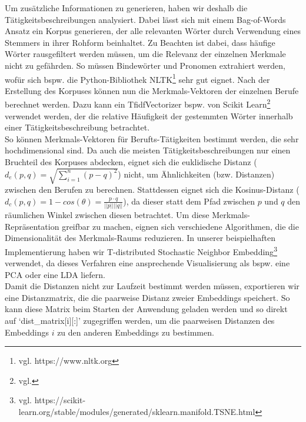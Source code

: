 \documentclass[10pt]{article}
\begin{document}
Um zusätzliche Informationen zu generieren, haben wir deshalb die Tätigkeitsbeschreibungen analysiert. Dabei lässt sich mit einem Bag-of-Words Ansatz ein Korpus generieren, der alle relevanten Wörter durch Verwendung eines Stemmers in ihrer Rohform beinhaltet. Zu Beachten ist dabei, dass häufige Wörter rausgefiltert werden müssen, um die Relevanz der einzelnen Merkmale nicht zu gefährden. So müssen Bindewörter und Pronomen extrahiert werden, wofür sich bspw. die Python-Bibliothek NLTK\footnote{vgl. https://www.nltk.org} sehr gut eignet. Nach der Erstellung des Korpuses können nun die Merkmals-Vektoren der einzelnen Berufe berechnet werden. Dazu kann ein TfidfVectorizer bspw. von Scikit Learn\footnote{vgl.} verwendet werden, der die relative Häufigkeit der gestemmten Wörter innerhalb einer Tätigkeitsbeschreibung betrachtet.\\

So können Merkmals-Vektoren für Berufts-Tätigkeiten bestimmt werden, die sehr hochdimensional sind. Da auch die meisten Tätigkeitsbeschreibungen nur einen Bruchteil des Korpuses abdecken, eignet sich die euklidische Distanz ($d_e(p,q) = \sqrt{\sum_{i=1}^n (p-q)^2}$) nicht, um Ähnlichkeiten (bzw. Distanzen) zwischen den Berufen zu berechnen. Stattdessen eignet sich die Kosinus-Distanz ($d_c(p,q) = 1 - cos(\theta) = \frac{p \cdot q}{||p|| ||q||}$), da dieser statt dem Pfad zwischen $p$ und $q$ den räumlichen Winkel zwischen diesen betrachtet. Um diese Merkmals-Repräsentation greifbar zu machen, eignen sich verschiedene Algorithmen, die die Dimensionalität des Merkmals-Raums reduzieren. In unserer beispielhaften Implementierung haben wir T-distributed Stochastic Neighbor Embedding\footnote{vgl. https://scikit-learn.org/stable/modules/generated/sklearn.manifold.TSNE.html} verwendet, da dieses Verfahren eine ansprechende Visualisierung als bspw. eine PCA oder eine LDA liefern.\\

Damit die Distanzen nicht zur Laufzeit bestimmt werden müssen, exportieren wir eine Distanzmatrix, die die paarweise Distanz zweier Embeddings speichert. So kann diese Matrix beim Starten der Anwendung geladen werden und so direkt auf `dist\_matrix[i][:]' zugegriffen werden, um die paarweisen Distanzen des Embeddings $i$ zu den anderen Embeddings zu bestimmen.
\end{document}
